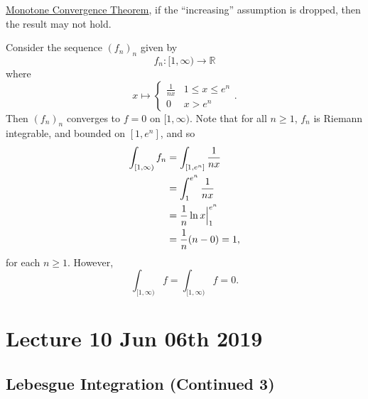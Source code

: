 \documentclass[notoc,notitlepage]{tufte-book}
\begin{document}
 \hyperref[thm:the_monotone_convergence_theorem]{Monotone
Convergence Theorem},  if the ``increasing'' assumption is dropped, then the
result may not hold.

\begin{eg}
  Consider the sequence $(f_n)_n$ given by
  \begin{equation*}
    f_n : [1, \infty) \to \mathbb{R}
  \end{equation*}
  where
  \begin{equation*}
    x \mapsto \begin{cases}
      \frac{1}{nx} & 1 \leq x \leq e^n \\
      0            & x > e^n
    \end{cases}.
  \end{equation*}
  Then $(f_n)_n$ converges  to $f = 0$ on $[1, \infty)$. Note
  that for all $n \geq 1$, $f_n$ is Riemann integrable, and bounded on $[1,
  e^n]$, and so
  \begin{align*}
    \int_{[1, \infty)} f_n &= \int_{[1, e^n]} \frac{1}{nx} \\
                           &= \int_{1}^{e^n} \frac{1}{nx} \\
                           &= \frac{1}{n} \ln x \Big|_{1}^{e^n} \\
                           &= \frac{1}{n} (n-0) = 1,
  \end{align*}
  for each $n \geq 1$. However,
  \begin{equation*}
    \int_{[1, \infty)} f = \int_{[1, \infty)} f = 0.
  \end{equation*}
\end{eg}



\chapter{Lecture 10 Jun 06th 2019}%
\label{chp:lecture_10_jun_06th_2019}

\section{Lebesgue Integration (Continued 3)}%
\label{sec:lebesgue_integration_continued_3}
\end{document}
